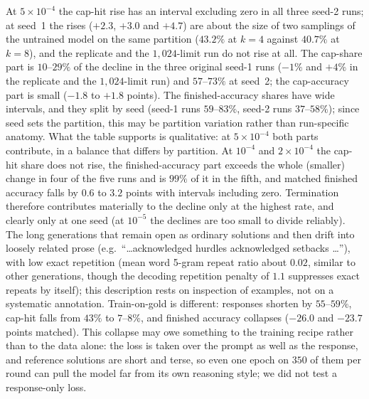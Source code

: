 \documentclass[runningheads]{llncs}
\begin{document}
At $5\times10^{-4}$ the cap-hit rise has an interval excluding zero in all three
seed-2 runs; at seed~1 the rises ($+2.3$, $+3.0$ and $+4.7$)
are about the size of two samplings of the untrained model on the same
partition ($43.2\%$ at $k=4$ against $40.7\%$ at $k=8$), and the replicate and
the $1{,}024$-limit run do not rise at all. The cap-share part is $10$--$29\%$
of the decline in the three original seed-1 runs ($-1\%$ and $+4\%$ in the
replicate and the $1{,}024$-limit run) and $57$--$73\%$ at seed~2; the
cap-accuracy part is small ($-1.8$ to $+1.8$ points). The finished-accuracy
shares have wide intervals, and they split by seed (seed-1 runs $59$--$83\%$,
seed-2 runs $37$--$58\%$); since seed sets the partition, this may be partition
variation rather than run-specific anatomy. What the table supports is
qualitative: at $5\times10^{-4}$ both parts contribute, in a balance that
differs by partition. At $10^{-4}$ and $2\times10^{-4}$ the cap-hit share does
not rise, the finished-accuracy part exceeds the whole (smaller) change in four
of the five runs and is $99\%$ of it in the fifth, and matched finished accuracy
falls by $0.6$ to $3.2$ points with intervals including zero. Termination
therefore contributes materially to the decline only at the highest rate, and
clearly only at one seed (at $10^{-5}$ the declines are too small to divide
reliably). The long
generations that remain open as ordinary solutions and then drift into loosely
related prose (e.g.\ ``\ldots acknowledged hurdles acknowledged setbacks
\ldots''), with low exact repetition (mean word 5-gram repeat ratio about
$0.02$, similar to other generations, though the decoding repetition penalty of
$1.1$ suppresses exact repeats by itself); this description rests on inspection
of examples, not on a systematic annotation. Train-on-gold is different: responses
shorten by $55$--$59\%$, cap-hit falls from $43\%$ to $7$--$8\%$, and finished
accuracy collapses ($-26.0$ and $-23.7$ points matched). This collapse may owe
something to the training recipe rather than to the data alone: the loss is
taken over the prompt as well as the response, and reference solutions are
short and terse, so even one epoch on $350$ of them per round can pull the model
far from its own reasoning style; we did not test a response-only loss.
\end{document}
